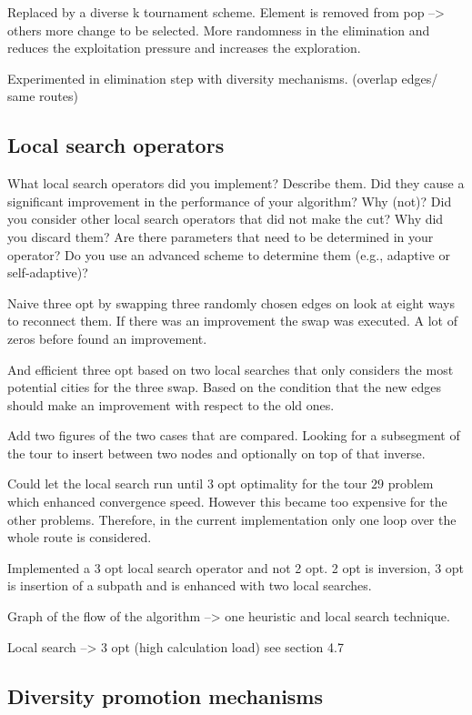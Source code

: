 \documentclass[a4paper,10pt]{article}
\newcommand{\ReplaceMe}[1]{{\color{blue}#1}}
\begin{document}
Replaced by a diverse k tournament scheme. Element is removed from 
pop --> others more change to be selected. More randomness in the elimination and reduces the exploitation pressure and increases the exploration. 

Experimented in elimination step with diversity mechanisms. (overlap edges/ same routes)

\subsection{Local search operators}\label{s:local_search}

\ReplaceMe{What local search operators did you implement? Describe them. Did they cause a significant improvement in the performance of your algorithm? Why (not)? Did you consider other local search operators that did not make the cut? Why did you discard them? Are there parameters that need to be determined in your operator? Do you use an advanced scheme to determine them (e.g., adaptive or self-adaptive)?}

Naive three opt by swapping three randomly chosen edges on look at eight ways to reconnect them. If there was an improvement the swap was executed. A lot of zeros before found an improvement. 

And efficient three opt based on two local searches that only considers the most potential cities for the three swap. Based on the condition that the new edges should make an improvement with respect to the old ones. 

Add two figures of the two cases that are compared. Looking for a subsegment of the tour to insert between two nodes and optionally on top of that inverse.

Could let the local search run until 3 opt optimality for the tour $29$ problem which enhanced convergence speed. However this became too expensive for the other problems. Therefore, in the current implementation only one loop over the whole route is considered. 

Implemented a 3 opt local search operator and not 2 opt. 2 opt is inversion, 3 opt is insertion of a subpath and is 
enhanced with two local searches. 

Graph of the flow of the algorithm --> one heuristic and local search technique. 

Local search --> 3 opt (high calculation load) see section 4.7

\subsection{Diversity promotion mechanisms}
\end{document}
